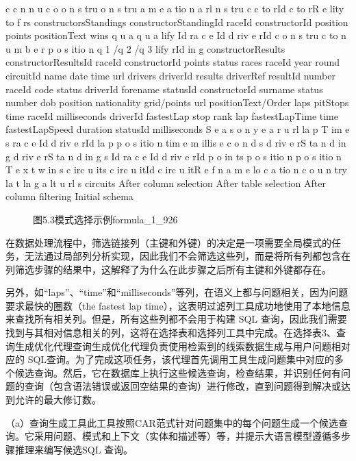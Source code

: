 \documentclass[12pt,a4paper,openright,UTF8]{ctexbook}
\begin{document}
c c n n u c o o n s tru o n s tru a m e a tio n a rl n s tru c c to rId c to rR e lity to f rs constructorsStandings constructorStandingId raceId constructorId position points positionText wins q u a q u a lify Id ra c e Id d riv e rId c o n s tru c to n u m b e r p o s itio n q 1 /q 2 /q 3 lify rId in g constructorResults constructorResultsId raceId constructorId points status races raceId year round circuitId name date time url drivers driverId results driverRef resultId number raceId code status driverId forename statusId constructorId surname status number dob position nationality grid/points url positionText/Order laps pitStops time raceId milliseconds driverId fastestLap stop rank lap fastestLapTime time fastestLapSpeed duration statusId milliseconds S e a s o n y e a r u rl la p T im e s ra c e Id d riv e rId la p p o s itio n tim e m illis e c o n d s d riv e rS ta n d in g d riv e rS ta n d in g s Id ra c e Id d riv e rId p o in ts p o s itio n p o s itio n T e x t w in s c irc u its c irc u itId c irc u itR e f n a m e lo c a tio n c o u n try la t ln g a lt u rl s circuits After column selection After table selection After column filtering Initial schema

\begin{figure}[htbp]
\centering
{}
\caption{图5.3模式选择示例formula_1_926}
\end{figure}

在数据处理流程中，筛选链接列（主键和外键）的决定是一项需要全局模式的任务，无法通过局部列分析实现，因此我们不会筛选这些列，而是将所有列都包含在列筛选步骤的结果中，这解释了为什么在此步骤之后所有主键和外键都存在。


另外，如“laps”、“time”和“milliseconds”等列，在语义上都与问题相关，因为问题要求最快的圈数（the fastest lap time），这表明过滤列工具成功地使用了本地信息来查找所有相关列。但是，所有这些列都不会用于构建 SQL 查询，因此我们需要找到与其相对信息相关的列，这将在选择表和选择列工具中完成。在选择表3、查询生成优化代理查询生成优化代理负责使用检索到的线索数据生成与用户问题相对应的 SQL查询。为了完成这项任务，该代理首先调用工具生成问题集中对应的多个候选查询。然后，它在数据库上执行这些候选查询，检查结果，并识别任何有问题的查询（包含语法错误或返回空结果的查询）进行修改，直到问题得到解决或达到允许的最大修订数。


（a）查询生成工具此工具按照CAR范式针对问题集中的每个问题生成一个候选查询。它采用问题、模式和上下文（实体和描述等）等，并提示大语言模型遵循多步骤推理来编写候选SQL 查询。
\end{document}

